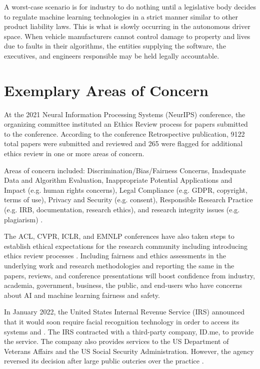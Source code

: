 \documentclass[conference]{IEEEtran}
\begin{document}
A worst-case scenario is for industry to do nothing until a legislative body decides to regulate machine learning technologies in a strict manner similar to other product liability laws. This is what is slowly occurring in the autonomous driver space. When vehicle manufacturers cannot control damage to property and lives due to faults in their algorithms, the entities supplying the software, the executives, and engineers responsible may be held legally accountable.


\section{Exemplary Areas of Concern}
At the 2021 Neural Information Processing Systems (NeurIPS) conference, the organizing committee instituted an Ethics Review process for papers submitted to the conference.
According to the conference Retrospective publication, 9122 total papers were submitted and reviewed and 265 were flagged for additional ethics review in one or more areas of concern.

Areas of concern included: Discrimination/Bias/Fairness Concerns, Inadequate Data and Algorithm Evaluation, Inappropriate Potential Applications and Impact (e.g. human rights concerns), Legal Compliance (e.g. GDPR, copyright, terms of use), Privacy and Security (e.g. consent), Responsible Research Practice (e.g. IRB, documentation, research ethics), and research integrity issues (e.g. plagiarism) \cite{b7}.

The ACL, CVPR, ICLR, and EMNLP conferences have also taken steps to establish ethical expectations for the research community including introducing ethics review processes \cite{b7}. Including fairness and ethics assessments in the underlying work and research methodologies and reporting the same in the papers, reviews, and conference presentations will boost confidence from industry, academia, government, business, the public, and end-users who have concerns about AI and machine learning fairness and safety.

In January 2022, the United States Internal Revenue Service (IRS) announced that it would soon require facial recognition technology in order to access its systems \cite{b8} and \cite{b9}. The IRS contracted with a third-party company, ID.me, to provide the service. The company also provides services to the US Department of Veterans Affairs and the US Social Security Administration.  However, the agency reversed its decision after large public outcries over the practice \cite{b10}.
\end{document}
